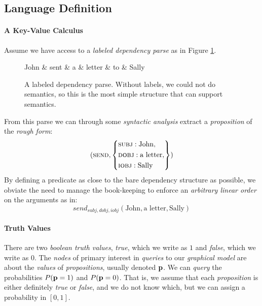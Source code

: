 \documentclass[11pt]{article}
\newcommand{\pvariable}{{\bf p}}
\begin{document}
\subsection{Language Definition}
\paragraph{A Key-Value Calculus}
Assume we have access to a {\em labeled dependency parse} as in Figure \ref{fig:dependency}.
\begin{figure}[h!]
    \centering
\begin{dependency}[theme = simple]
    \begin{deptext}[column sep=1em]
       John \& sent \& a \& letter \& to \& Sally \\
    \end{deptext}
\end{dependency}
\caption{A labeled dependency parse. Without labels, we could not do semantics, so this is the most simple structure that can support semantics.}
\label{fig:dependency}
\end{figure}
From this parse we can through some {\em syntactic analysis} extract a {\em proposition} of the {\em rough form}:
\begin{equation}
(\textsc{send}, \left\{
\begin{aligned}
&\textsc{subj}: \text{John}, \\
&\textsc{dobj}: \text{a letter}, \\
&\textsc{iobj}: \text{Sally}
\end{aligned}
\right\})
\label{eq:dep-semantics}
\end{equation}
By defining a predicate as close to the bare dependency structure as possible, we obviate the need to manage the book-keeping to enforce an {\em arbitrary linear order} on the arguments as in:
\begin{equation} 
    send_{subj,dobj,iobj}(\text{John}, \text{a letter}, \text{Sally})
\end{equation}

\paragraph{Truth Values}
There are two {\em boolean truth values}, {\em true}, which we write as $1$ and {\em false}, which we write as $0$.
The {\em nodes} of primary interest in {\em queries} to our {\em graphical model} are about the {\em values} of {\em propositions}, usually denoted $\pvariable$.
We can {\em query} the probabilities $P(\pvariable = 1)$ and $P(\pvariable = 0)$.
That is, we assume that each {\em proposition} is either definitely {\em true} or {\em false}, and we do not know which, but we can assign a probability in $[0, 1]$.
\end{document}
